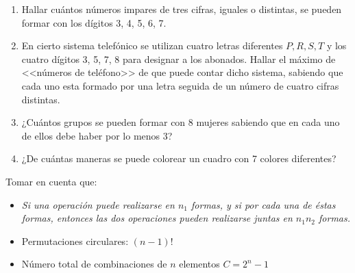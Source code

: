 \documentclass[12pt,letterpaper]{report}
\begin{document}
\begin{enumerate}
\begin{enumerate}
	 				\begin{enumerate}
	 					\item uno de ellos debe figurar en cada grupo seleccionado
	 					\item dos de ellos no deben figurar en cada grupo seleccionado
	 					\item uno de ellos debe, y otros 2 no deben, figurar en cada grupo
	 				\end{enumerate}
	 				\item Hallar cuántos números impares de tres cifras, iguales o distintas, se pueden formar con los dígitos 3, 4, 5, 6, 7.
	 				\item En cierto sistema telefónico se utilizan cuatro letras diferentes $P,R,S,T$ y los cuatro dígitos 3, 5, 7, 8 para designar a los abonados. Hallar el máximo de <<números de teléfono>> de que puede contar dicho sistema, sabiendo que cada uno esta formado por una letra seguida de un número de cuatro cifras distintas.
	 				\item ¿Cuántos grupos se pueden formar con 8 mujeres sabiendo que en cada uno de ellos debe haber por lo menos 3?
	 				\item ¿De cuántas maneras se puede colorear un cuadro con 7 colores diferentes?
	 		\end{enumerate}
	 		
	 		Tomar en cuenta que: 
	 		\begin{itemize}
	 			\item \textit{Si una operación puede realizarse en $n_1$ formas, y si por cada una de éstas formas, entonces  las dos operaciones pueden realizarse juntas en $n_1 n_2$ formas.} 
	 			\item Permutaciones circulares: $(n-1)!$
	 			\item Número total de combinaciones de $n$ elementos $C = 2^n - 1$
	 		\end{itemize}
	 		
	 \end{enumerate}
	 
	
	
\end{document}
